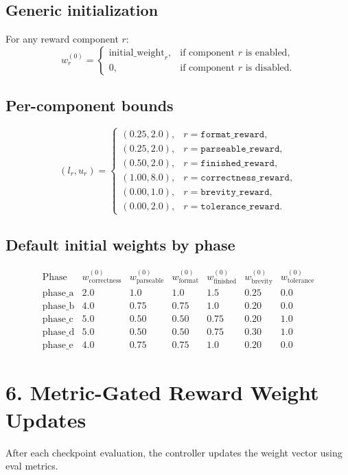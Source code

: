 \documentclass[11pt]{article}
\begin{document}
\subsection*{Generic initialization}
For any reward component $r$:
\[
w_r^{(0)}
=
\begin{cases}
\mathrm{initial\_weight}_r, & \text{if component } r \text{ is enabled}, \\
0, & \text{if component } r \text{ is disabled.}
\end{cases}
\]

\subsection*{Per-component bounds}
\[
(l_r, u_r) =
\begin{cases}
(0.25, 2.0), & r=\texttt{format\_reward}, \\
(0.25, 2.0), & r=\texttt{parseable\_reward}, \\
(0.50, 2.0), & r=\texttt{finished\_reward}, \\
(1.00, 8.0), & r=\texttt{correctness\_reward}, \\
(0.00, 1.0), & r=\texttt{brevity\_reward}, \\
(0.00, 2.0), & r=\texttt{tolerance\_reward}.
\end{cases}
\]

\subsection*{Default initial weights by phase}
\[
\begin{array}{l|cccccc}
\text{Phase}
& w_{\mathrm{correctness}}^{(0)}
& w_{\mathrm{parseable}}^{(0)}
& w_{\mathrm{format}}^{(0)}
& w_{\mathrm{finished}}^{(0)}
& w_{\mathrm{brevity}}^{(0)}
& w_{\mathrm{tolerance}}^{(0)} \\
\hline
\text{phase\_a} & 2.0 & 1.0 & 1.0 & 1.5 & 0.25 & 0.0 \\
\text{phase\_b} & 4.0 & 0.75 & 0.75 & 1.0 & 0.20 & 0.0 \\
\text{phase\_c} & 5.0 & 0.50 & 0.50 & 0.75 & 0.20 & 1.0 \\
\text{phase\_d} & 5.0 & 0.50 & 0.50 & 0.75 & 0.30 & 1.0 \\
\text{phase\_e} & 4.0 & 0.75 & 0.75 & 1.0 & 0.20 & 0.0
\end{array}
\]

\section*{6. Metric-Gated Reward Weight Updates}
After each checkpoint evaluation, the controller updates the weight vector using eval metrics.
\end{document}
